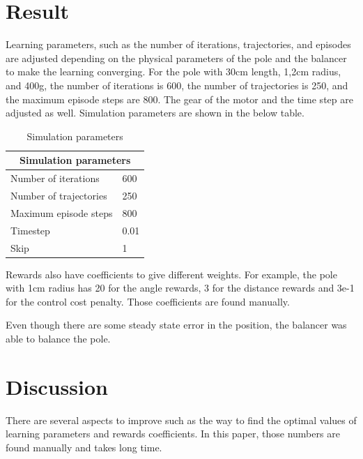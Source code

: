 \documentclass{article}
\begin{document}

\section{Result}

Learning parameters, such as the number of iterations, trajectories, and episodes are adjusted depending on the physical parameters of the pole and the balancer to make the learning converging. For the pole with 30cm length, 1,2cm radius, and 400g, the number of iterations is 600, the number of trajectories is 250, and the maximum episode steps are 800. The gear of the motor and the time step are adjusted as well. Simulation parameters are shown in the below table.

\begin{table}[h!]
\centering
  \begin{center}
  \begin{tabular}{ |p{4cm}||p{2cm}|  }
  \hline
  \multicolumn{2}{|c|}{Simulation parameters} \\[0.5ex]
  \hline
  Number of iterations & 600\\
  Number of trajectories & 250\\
  Maximum episode steps & 800\\
  Timestep & 0.01\\
  Skip & 1\\
  \hline
  \end{tabular}
  \end{center}
  \caption{Simulation parameters}
  \label{table:1}
\end{table}

Rewards also have coefficients to give different weights. For example, the pole with 1cm radius has 20 for the angle rewards, 3 for the distance rewards and 3e-1 for the control cost penalty. Those coefficients are found manually.

Even though there are some steady state error in the position, the balancer was able to balance the pole.


\section{Discussion}

There are several aspects to improve such as the way to find the optimal values of learning parameters and rewards coefficients. In this paper, those numbers are found manually and takes long time. 
\end{document}
